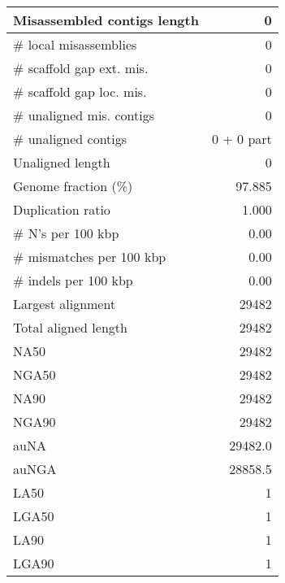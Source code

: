 \documentclass[12pt,a4paper]{article}
\begin{document}
\begin{table}[ht]
\begin{center}
\begin{tabular}{|l*{1}{|r}|}
Misassembled contigs length & 0 \\ \hline
\# local misassemblies & 0 \\ \hline
\# scaffold gap ext. mis. & 0 \\ \hline
\# scaffold gap loc. mis. & 0 \\ \hline
\# unaligned mis. contigs & 0 \\ \hline
\# unaligned contigs & 0 + 0 part \\ \hline
Unaligned length & 0 \\ \hline
Genome fraction (\%) & 97.885 \\ \hline
Duplication ratio & 1.000 \\ \hline
\# N's per 100 kbp & 0.00 \\ \hline
\# mismatches per 100 kbp & 0.00 \\ \hline
\# indels per 100 kbp & 0.00 \\ \hline
Largest alignment & 29482 \\ \hline
Total aligned length & 29482 \\ \hline
NA50 & 29482 \\ \hline
NGA50 & 29482 \\ \hline
NA90 & 29482 \\ \hline
NGA90 & 29482 \\ \hline
auNA & 29482.0 \\ \hline
auNGA & 28858.5 \\ \hline
LA50 & 1 \\ \hline
LGA50 & 1 \\ \hline
LA90 & 1 \\ \hline
LGA90 & 1 \\ \hline
\end{tabular}
\end{center}
\end{table}
\end{document}
